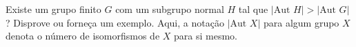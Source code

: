 Existe um grupo finito \( G \) com um subgrupo normal \( H \) tal que \( |\text{Aut } H| > |\text{Aut } G| \)? Disprove ou forneça um exemplo. Aqui, a notação \( |\text{Aut } X| \) para algum grupo \( X \) denota o número de isomorfismos de \( X \) para si mesmo.
